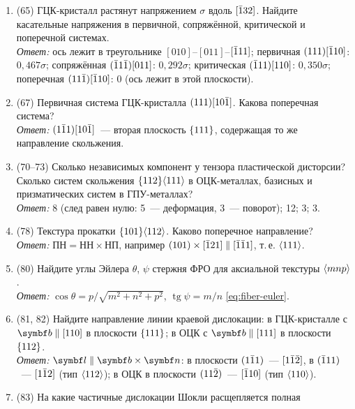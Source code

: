 \begin{enumerate}[label={\sffamily\bfseries\color{fmHead}\arabic*.}]
$c_{12}=27$, $c_{13}=14$, $c_{33}=336$, $c_{44}=162$~ГПа, $c/a=1{,}57$).\\
\emph{Ответ:} в базисной плоскости гексагональный кристалл упруго
изотропен: $E=289$~ГПа вдоль обоих направлений; вдоль $[\br1011]$
(угол $47{,}8^\circ$ с осью $c$) $E\approx321$~ГПа; вдоль $[0001]$~— 335~ГПа.
\item (65) ГЦК-кристалл растянут напряжением $\sigma$ вдоль $[\bar{1}32]$. Найдите
касательные напряжения в первичной, сопряжённой, критической и
поперечной системах.\\
\emph{Ответ:} ось лежит в треугольнике $[010]$--$[011]$--$[\bar{1}11]$;
первичная $(111)[\bar{1}10]$: $0{,}467\sigma$; сопряжённая $(\bar{1}1\bar{1})[011]$:
$0{,}292\sigma$; критическая $(\bar{1}11)[110]$: $0{,}350\sigma$; поперечная
$(11\bar{1})[\bar{1}10]$: 0 (ось лежит в этой плоскости).
\item (67) Первичная система ГЦК-кристалла $(111)[10\bar{1}]$. Какова
поперечная система?\\
\emph{Ответ:} $(1\bar{1}1)[10\bar{1}]$~— вторая плоскость $\{111\}$, содержащая
то же направление скольжения.
\item (70--73) Сколько независимых компонент у тензора пластической
дисторсии? Сколько систем скольжения $\{112\}\langle 111\rangle$ в ОЦК-металлах,
базисных и призматических систем в ГПУ-металлах?\\
\emph{Ответ:} 8 (след равен нулю: 5~— деформация, 3~— поворот);
12; 3; 3.
\item (78) Текстура прокатки $\{101\}\langle 112\rangle$. Каково поперечное
направление?\\
\emph{Ответ:} $\text{ПН}=\text{НН}\times\text{НП}$, например
$(101)\times[\bar{1}21]\parallel[\bar{1}\bar{1}1]$, т.\,е. $\langle 111\rangle$.
\item (80) Найдите углы Эйлера $\theta$, $\psi$ стержня ФРО для аксиальной
текстуры $\langle mnp\rangle$.\\
\emph{Ответ:} $\cos\theta=p/\sqrt{m^2+n^2+p^2}$, $\operatorname{tg}\psi=m/n$
\eqref{eq:fiber-euler}.
\item (81, 82) Найдите направление линии краевой дислокации: в
ГЦК-кристалле с $\vb b\parallel[110]$ в плоскости $\{111\}$; в ОЦК с
$\vb b\parallel[111]$ в плоскости $\{112\}$.\\
\emph{Ответ:} $\vb l\parallel\vb b\times\vb n$: в плоскости $(1\bar{1}1)$~—
$[1\bar{1}\bar{2}]$, в $(\bar{1}11)$~— $[1\bar{1}2]$ (тип $\langle 112\rangle$); в ОЦК в
плоскости $(11\bar{2})$~— $[\bar{1}10]$ (тип $\langle 110\rangle$).
\item (83) На какие частичные дислокации Шокли расщепляется полная

\end{enumerate}
